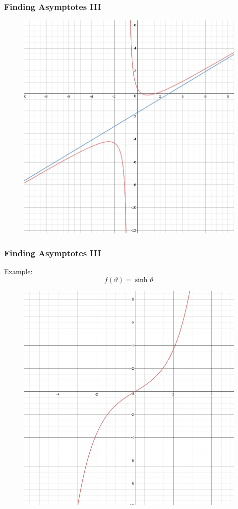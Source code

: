 \documentclass[xcolor=dvipsnames]{beamer}
\begin{document}
\begin{frame}
  \frametitle{Finding Asymptotes III}
\begin{figure}[h]
\includegraphics[scale=.35]{./diagrams/asymp5.png}
\end{figure}
\end{frame}

\begin{frame}
  \frametitle{Finding Asymptotes III}
Example:
\begin{equation}
  \label{eq:waduoqui}
  f(\vartheta)=\sinh\vartheta
\end{equation}
\begin{figure}[h]
\includegraphics[scale=.25]{./diagrams/asymp6.png}
\end{figure}
\end{frame}
\end{document}

